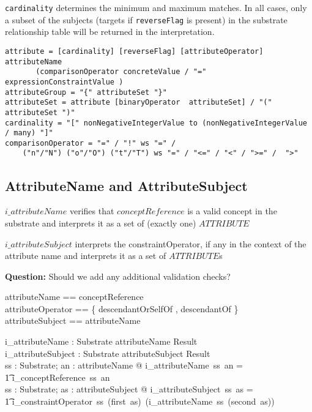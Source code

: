 \documentclass{article}
\def\spec#1{{\tt #1}}
\begin{document}
\spec{cardinality} determines the minimum and maximum matches.  In all cases, only a subset of the subjects 
(targets if \spec{reverseFlag} is present) in the substrate relationship table will be returned in the interpretation.



\begin{verbatim}
attribute = [cardinality] [reverseFlag] [attributeOperator] attributeName 			
       (comparisonOperator concreteValue / "=" expressionConstraintValue )
attributeGroup = "{" attributeSet "}" 
attributeSet = attribute [binaryOperator  attributeSet] / "(" attributeSet ")" 
cardinality = "[" nonNegativeIntegerValue to (nonNegativeIntegerValue / many) "]" 
comparisonOperator = "=" / "!" ws "=" / 
    ("n"/"N") ("o"/"O") ("t"/"T") ws "=" / "<=" / "<" / ">=" /  ">"
\end{verbatim}

\subsection{AttributeName and AttributeSubject}
$i\_attributeName$ verifies that  $conceptReference$ is a valid concept in the substrate and
interprets it as a set of (exactly one) $ATTRIBUTE$

$i\_attributeSubject$ interprets the constraintOperator, if any in the context of the attribute name and
interprets it as a set of $ATTRIBUTE$s

\textbf{Question:} Should we add any additional validation checks?
\begin{zed}
attributeName == conceptReference \\
\also
attributeOperator ==  \{ descendantOrSelfOf , descendantOf \} \\
attributeSubject == \optional[attributeOperator] \cross attributeName 
\end{zed}

\begin{gendef}
   i\_attributeName : Substrate \pfun attributeName \pfun Result \\
   i\_attributeSubject : Substrate \pfun attributeSubject \pfun Result \\
\where
   \forall ss : Substrate; an : attributeName @ i\_attributeName~ss~an = \\
\t1 i\_conceptReference~ss~an \\
\also
   \forall ss : Substrate; as : attributeSubject @ i\_attributeSubject~ss~as = \\
\t1 i\_constraintOperator~ss~(first~as)~(i\_attributeName~ss~(second~as)) \\
\end{gendef}
\end{document}
